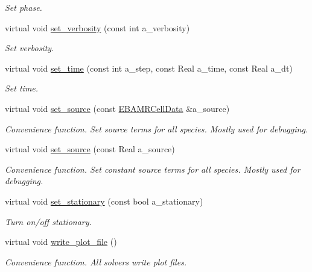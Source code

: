 \begin{DoxyCompactItemize}
\begin{DoxyCompactList}\small\item\em Set phase. \end{DoxyCompactList}\item 
virtual void \hyperlink{classrte__layout_a90960ce9bb2292eba513b6c095762030}{set\+\_\+verbosity} (const int a\+\_\+verbosity)
\begin{DoxyCompactList}\small\item\em Set verbosity. \end{DoxyCompactList}\item 
virtual void \hyperlink{classrte__layout_a9b624283fbe7774974ccd27e1bbee7a3}{set\+\_\+time} (const int a\+\_\+step, const Real a\+\_\+time, const Real a\+\_\+dt)
\begin{DoxyCompactList}\small\item\em Set time. \end{DoxyCompactList}\item 
virtual void \hyperlink{classrte__layout_adae7729cb0614988c202084ff480222c}{set\+\_\+source} (const \hyperlink{type__definitions_8H_a7e610f301989e5e07781c5e338bdb7c3}{E\+B\+A\+M\+R\+Cell\+Data} \&a\+\_\+source)
\begin{DoxyCompactList}\small\item\em Convenience function. Set source terms for all species. Mostly used for debugging. \end{DoxyCompactList}\item 
virtual void \hyperlink{classrte__layout_a9ecb244c4f654c721d39ae25850a384b}{set\+\_\+source} (const Real a\+\_\+source)
\begin{DoxyCompactList}\small\item\em Convenience function. Set constant source terms for all species. Mostly used for debugging. \end{DoxyCompactList}\item 
virtual void \hyperlink{classrte__layout_ab19bbaf2bf80ab966dbbd954c1f81c55}{set\+\_\+stationary} (const bool a\+\_\+stationary)
\begin{DoxyCompactList}\small\item\em Turn on/off stationary. \end{DoxyCompactList}\item 
virtual void \hyperlink{classrte__layout_adad75a7761cb90f915fb72caa904a2a2}{write\+\_\+plot\+\_\+file} ()
\begin{DoxyCompactList}\small\item\em Convenience function. All solvers write plot files. \end{DoxyCompactList}\item 

\end{DoxyCompactItemize}
